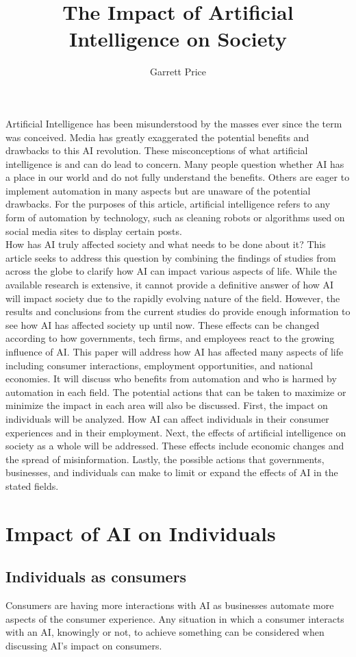 \documentclass[man]{apa6}
\title{The Impact of Artificial Intelligence on Society}
\author{Garrett Price}
\affiliation{Brigham Young University}
\begin{document}
\maketitle
Artificial Intelligence has been misunderstood by the masses ever since the term was conceived.  Media has greatly exaggerated the potential
benefits and drawbacks to this AI revolution.  These misconceptions of what artificial intelligence is and can do lead to concern. Many people question
whether AI has a place in our world and do not fully understand the benefits. Others are eager to implement automation in many aspects but are unaware of the
potential drawbacks.  For the purposes of this article, artificial intelligence refers to any form of automation by technology, such as cleaning robots or algorithms used on social media sites to display certain posts.\\
How has AI truly affected society and what needs to be done about it? This article seeks to address this question by combining the findings of studies from across the globe to clarify how AI can impact various aspects of life.  While the available research is extensive, it cannot provide a definitive answer of how AI will impact society due to the rapidly evolving nature of the field.  However, the results and conclusions from the current studies do provide enough information to see how AI has affected society up until now.  These effects can be changed according to how governments, tech firms, and employees react to the growing influence of AI.  This paper will address how AI has affected many aspects of life including consumer interactions, employment opportunities, and national economies.  It will discuss who benefits from automation and who is harmed by automation in each field.  The potential actions that can be taken to maximize or minimize the impact in each area will also be discussed.  First, the impact on individuals will be analyzed.  How AI can affect individuals in their consumer experiences and in their employment.  Next, the effects of artificial intelligence on society as a whole will be addressed.  These effects include economic changes and the spread of misinformation.  Lastly, the possible actions that governments, businesses, and individuals can make to limit or expand the effects of AI in the stated fields.
\newpage
\section*{Impact of AI on Individuals}
\subsection*{Individuals as consumers}
Consumers are having more interactions with AI as businesses automate more aspects of the consumer experience.  Any situation in which a consumer interacts with an AI, knowingly or not, to achieve something can be considered when discussing AI's impact on consumers.\\
\end{document}
